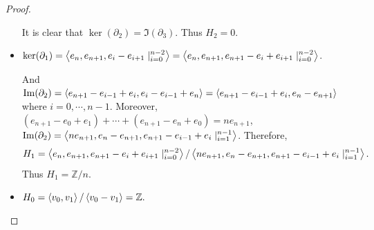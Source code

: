 \documentclass[12pt, psamsfonts]{amsart}
\theoremstyle{definition}
\theoremstyle{remark}
\numberwithin{equation}{section}
\begin{document}
\begin{proof}
\begin{itemize}
      It is clear that $\ker(\partial_2) = \Im(\partial_3)$.
      Thus $H_2 = 0$.
    \item
      $\ker(\partial_1) = \ev{ e_n, e_{n + 1}, e_i - e_{i + 1} \mid_{i=0}^{n-2} } = \ev{e_n, e_{n + 1}, e_{n + 1} - e_{i} + e_{i + 1} \mid_{i=0}^{n-2}}$.

      And $\Im(\partial_2) = \ev{ e_{n + 1} - e_{i - 1} + e_i, e_i - e_{i - 1} + e_n } = \ev{ e_{n + 1} - e_{i - 1} + e_i, e_n - e_{n + 1} }$ where $i = 0, \cdots, n - 1$.
      Moreover, $(e_{n + 1} - e_0 + e_1) + \cdots + (e_{n + 1} - e_{n} + e_0) = ne_{n + 1}$, $\Im(\partial_2) = \ev{ ne_{n + 1}, e_{n} - e_{n + 1}, e_{n + 1} - e_{i - 1} + e_i \mid_{i=1}^{n - 1} }$.
      Therefore, 
      \begin{align*}
      H_1 = \ev{e_n, e_{n + 1}, e_{n + 1} - e_{i} + e_{i + 1} \mid_{i=0}^{n-2}} / \ev{ ne_{n + 1}, e_{n} - e_{n + 1}, e_{n + 1} - e_{i - 1} + e_i \mid_{i=1}^{n - 1} }.
      \end{align*}
      Thus $H_1 = \mathbb{Z}/n$.
    \item
      $H_0 = \ev{ v_0, v_1 } / \ev{ v_0 - v_1 } = \mathbb{Z}.$
  \end{itemize}
\end{proof}
\end{document}
